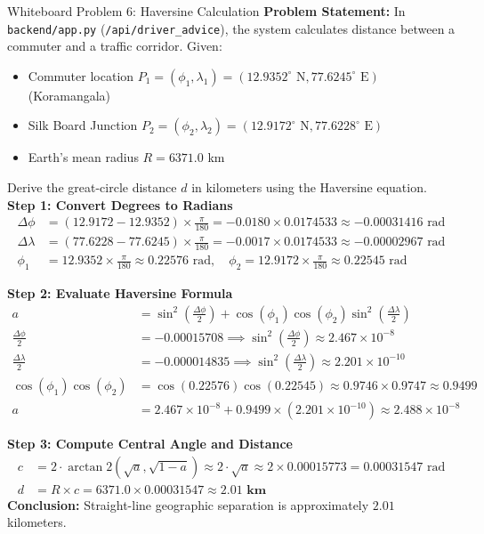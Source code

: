 \begin{interviewq}{Whiteboard Problem 6: Haversine Calculation}
\textbf{Problem Statement:}
In \texttt{backend/app.py} (\texttt{/api/driver\_advice}), the system calculates distance between a commuter and a traffic corridor. Given:
\begin{itemize}
    \item Commuter location $P_1 = (\phi_1, \lambda_1) = (12.9352^\circ\text{ N}, 77.6245^\circ\text{ E})$ (Koramangala)
    \item Silk Board Junction $P_2 = (\phi_2, \lambda_2) = (12.9172^\circ\text{ N}, 77.6228^\circ\text{ E})$
    \item Earth's mean radius $R = 6371.0$ km
\end{itemize}
Derive the great-circle distance $d$ in kilometers using the Haversine equation.
\tcblower
\textbf{Step 1: Convert Degrees to Radians}
\begin{align*}
\Delta \phi &= (12.9172 - 12.9352) \times \frac{\pi}{180} = -0.0180 \times 0.0174533 \approx -0.00031416 \text{ rad} \\
\Delta \lambda &= (77.6228 - 77.6245) \times \frac{\pi}{180} = -0.0017 \times 0.0174533 \approx -0.00002967 \text{ rad} \\
\phi_1 &= 12.9352 \times \frac{\pi}{180} \approx 0.22576 \text{ rad}, \quad \phi_2 = 12.9172 \times \frac{\pi}{180} \approx 0.22545 \text{ rad}
\end{align*}

\textbf{Step 2: Evaluate Haversine Formula}
\begin{align*}
a &= \sin^2\left(\frac{\Delta \phi}{2}\right) + \cos(\phi_1)\cos(\phi_2)\sin^2\left(\frac{\Delta \lambda}{2}\right) \\
\frac{\Delta \phi}{2} &= -0.00015708 \implies \sin^2\left(\frac{\Delta \phi}{2}\right) \approx 2.467 \times 10^{-8} \\
\frac{\Delta \lambda}{2} &= -0.000014835 \implies \sin^2\left(\frac{\Delta \lambda}{2}\right) \approx 2.201 \times 10^{-10} \\
\cos(\phi_1)\cos(\phi_2) &= \cos(0.22576)\cos(0.22545) \approx 0.9746 \times 0.9747 \approx 0.9499 \\
a &= 2.467 \times 10^{-8} + 0.9499 \times (2.201 \times 10^{-10}) \approx 2.488 \times 10^{-8}
\end{align*}

\textbf{Step 3: Compute Central Angle and Distance}
\begin{align*}
c &= 2 \cdot \arctan2(\sqrt{a}, \sqrt{1 - a}) \approx 2 \cdot \sqrt{a} \approx 2 \times 0.00015773 = 0.00031547 \text{ rad} \\
d &= R \times c = 6371.0 \times 0.00031547 \approx \mathbf{2.01 \text{ km}}
\end{align*}
\textbf{Conclusion:} Straight-line geographic separation is approximately $2.01$ kilometers.
\end{interviewq}

